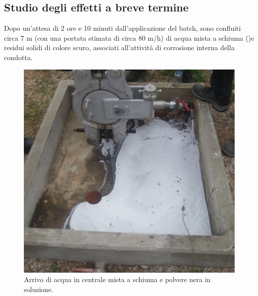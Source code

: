 \subsection{Studio degli effetti a breve termine}
Dopo un'attesa di 2 ore e 10 minuti dall'applicazione del batch, sono confluiti circa 7 m (con una portata stimata di circa 80 m/h) di acqua mista a schiuma ()e residui solidi di colore scuro, associati all'attività di corrosione interna della condotta.

\begin{figure}[htbp]
    \centering
    \includegraphics[width=.5\textwidth]{fig/test/arrivo-centrale}
    \caption{Arrivo di acqua in centrale mista a schiuma e polvere nera in soluzione.} 
    \label{fig:test-arrivocentrale}
\end{figure}


